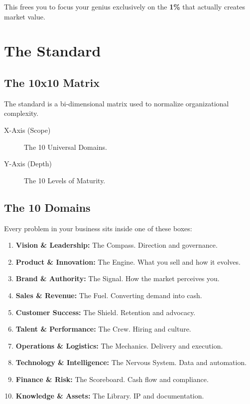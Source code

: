\documentclass[11pt, a4paper, oneside]{report}
\begin{document}
This frees you to focus your genius exclusively on the \textbf{1\%} that actually creates market value.

\chapter{The Standard}
\section*{The 10x10 Matrix}

The standard is a bi-dimensional matrix used to normalize organizational complexity.

\begin{description}
    \item[X-Axis (Scope)] The 10 Universal Domains.
    \item[Y-Axis (Depth)] The 10 Levels of Maturity.
\end{description}

\section*{The 10 Domains}
Every problem in your business sits inside one of these boxes:

\begin{enumerate}
    \item \textbf{Vision \& Leadership:} The Compass. Direction and governance.
    \item \textbf{Product \& Innovation:} The Engine. What you sell and how it evolves.
    \item \textbf{Brand \& Authority:} The Signal. How the market perceives you.
    \item \textbf{Sales \& Revenue:} The Fuel. Converting demand into cash.
    \item \textbf{Customer Success:} The Shield. Retention and advocacy.
    \item \textbf{Talent \& Performance:} The Crew. Hiring and culture.
    \item \textbf{Operations \& Logistics:} The Mechanics. Delivery and execution.
    \item \textbf{Technology \& Intelligence:} The Nervous System. Data and automation.
    \item \textbf{Finance \& Risk:} The Scoreboard. Cash flow and compliance.
    \item \textbf{Knowledge \& Assets:} The Library. IP and documentation.
\end{enumerate}
\end{document}
